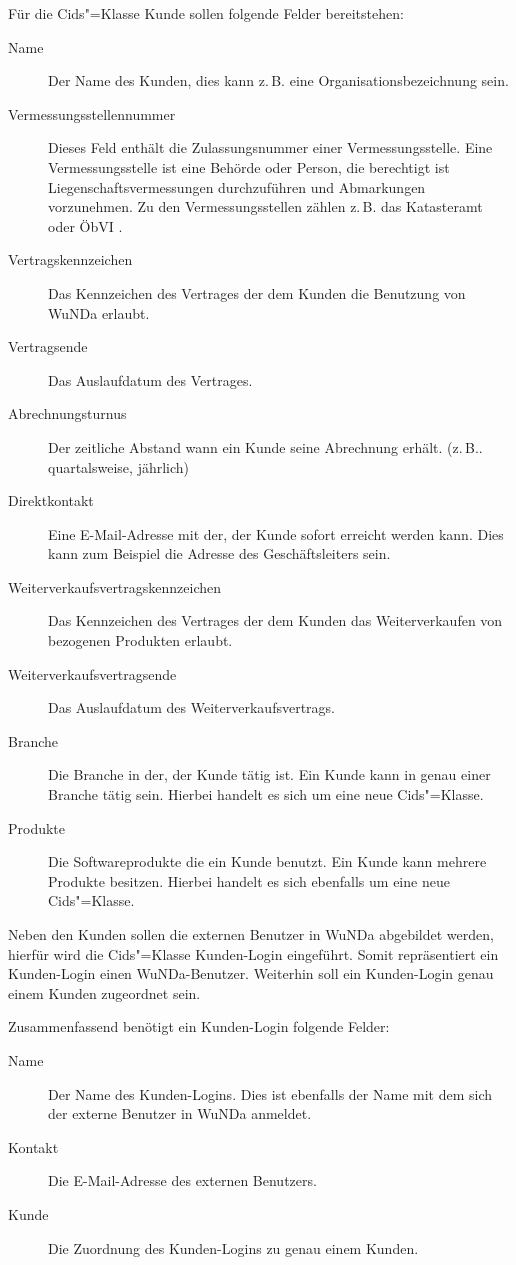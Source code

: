 Für die Cids"=Klasse Kunde sollen folgende Felder bereitstehen:
\begin{description}
\item[Name] Der Name des Kunden, dies kann z.\,B. eine Organisationsbezeichnung sein.
\item[Vermessungsstellennummer] Dieses Feld enthält die Zulassungsnummer einer Vermessungsstelle. Eine Vermessungsstelle ist eine Behörde oder Person, die berechtigt ist Liegenschaftsvermessungen durchzuführen und Abmarkungen vorzunehmen. Zu den Vermessungsstellen zählen z.\,B. das Katasteramt oder ÖbVI \autocite[vgl.][]{recklinghausen-vermessungsstelle}.
\item[Vertragskennzeichen] Das Kennzeichen des Vertrages der dem Kunden die Benutzung von \ac{WuNDa} erlaubt.
\item[Vertragsende] Das Auslaufdatum des Vertrages.
\item[Abrechnungsturnus] Der zeitliche Abstand wann ein Kunde seine Abrechnung erhält. (z.\,B.. quartalsweise, jährlich)
\item[Direktkontakt] Eine E-Mail-Adresse mit der, der Kunde sofort erreicht werden kann. Dies kann zum Beispiel die Adresse des Geschäftsleiters sein.
\item[Weiterverkaufsvertragskennzeichen] Das Kennzeichen des Vertrages der dem Kunden das Weiterverkaufen von bezogenen Produkten erlaubt.
\item[Weiterverkaufsvertragsende] Das Auslaufdatum des Weiterverkaufsvertrags.
\item[Branche] Die Branche in der, der Kunde tätig ist. Ein Kunde kann in genau einer Branche tätig sein. Hierbei handelt es sich um eine neue Cids"=Klasse.
\item[Produkte] Die Softwareprodukte die ein Kunde benutzt. Ein Kunde kann mehrere Produkte besitzen. Hierbei handelt es sich ebenfalls um eine neue Cids"=Klasse.
\end{description}

Neben den Kunden sollen die externen Benutzer in \ac{WuNDa} abgebildet werden, hierfür wird die Cids"=Klasse Kunden-Login eingeführt.
Somit repräsentiert ein Kunden-Login einen \ac{WuNDa}-Benutzer.
Weiterhin soll ein Kunden-Login genau einem Kunden zugeordnet sein. 

Zusammenfassend benötigt ein Kunden-Login folgende Felder:
\begin{description}
\item[Name] Der Name des Kunden-Logins. Dies ist ebenfalls der Name mit dem sich der externe Benutzer in \ac{WuNDa} anmeldet.
\item[Kontakt] Die E-Mail-Adresse des externen Benutzers.
\item[Kunde] Die Zuordnung des Kunden-Logins zu genau einem Kunden.
\end{description}

